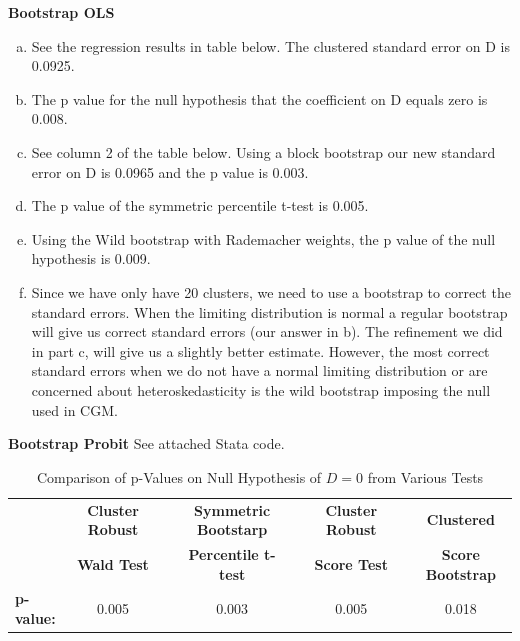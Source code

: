 \documentclass[11pt]{article}
\begin{document}
\bigskip \textbf{Bootstrap OLS}

\begin{enumerate}[(a)]
	\item See the regression results in table below. The clustered standard error on D is 0.0925.
	\item The p value for the null hypothesis that the coefficient on D equals zero is 0.008.
	\item See column 2 of the table below. Using a block bootstrap our new standard error on D is 0.0965 and the p value is 0.003.
	\item The p value of the symmetric percentile t-test is 0.005.
	\item Using the Wild bootstrap with Rademacher weights, the p value of the null hypothesis is 0.009.
	\item Since we have only have 20 clusters, we need to use a bootstrap to correct the standard errors. When the limiting distribution is normal a regular bootstrap will give us correct standard errors (our answer in b). The refinement we did in part c, will give us a slightly better estimate. However, the most correct standard errors when we do not have a normal limiting distribution or are concerned about heteroskedasticity is the wild bootstrap imposing the null used in CGM. 
\end{enumerate}




\bigskip \textbf{Bootstrap Probit}
See attached Stata code.
\begin{table}[htbp]
  \centering
  \caption{Comparison of p-Values on Null Hypothesis of $D = 0$ from Various Tests}
  \begin{adjustbox}{max width=\textwidth}
    \begin{tabular}{lccccccc}
    \toprule
          & \textbf{Cluster Robust} &       & \textbf{Symmetric Bootstarp} &       & \textbf{Cluster Robust} &       & \textbf{Clustered} \\
          & \textbf{Wald Test} &       & \textbf{Percentile t-test} &       & \textbf{Score Test} &       & \textbf{Score Bootstrap} \\
\cmidrule{2-2}\cmidrule{4-4}\cmidrule{6-6}\cmidrule{8-8}    \textbf{p-value:} & 0.005 &       & 0.003 &       & 0.005 &       & 0.018 \\
    \bottomrule
    \end{tabular}%
    \end{adjustbox}
  \label{tab:addlabel}%
\end{table}%
\end{document}
